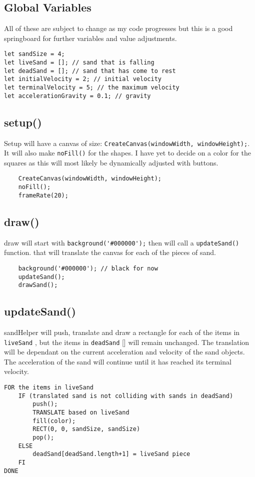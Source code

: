 \documentclass[12 pt]{report}
\begin{document}
\subsection{Global Variables} 
All of these are subject to change as my code progresses but this is a good springboard for further variables and value adjustments. 
\begin{verbatim}
let sandSize = 4; 
let liveSand = []; // sand that is falling
let deadSand = []; // sand that has come to rest
let initialVelocity = 2; // initial velocity
let terminalVelocity = 5; // the maximum velocity
let accelerationGravity = 0.1; // gravity
\end{verbatim}

\subsection{setup()} 
Setup will have a canvas of size: \verb|CreateCanvas(windowWidth, windowHeight);|. It will also make \verb|noFill()| for the shapes. I have yet to decide on a color for the squares as this will most likely be dynamically adjusted with buttons.
\begin{verbatim}
    CreateCanvas(windowWidth, windowHeight);
    noFill();
    frameRate(20);
\end{verbatim}


\subsection{draw()}
draw will start with \verb|background('#000000');| then will call a \verb|updateSand()| function. that will translate the canvas for each of the pieces of sand.
\begin{verbatim}
    background('#000000'); // black for now
    updateSand(); 
    drawSand();
\end{verbatim}

\subsection{updateSand()} 
sandHelper will push, translate and draw a rectangle for each of the items in \verb|liveSand| , but the items in \verb|deadSand| [] will remain unchanged. The translation will be dependant on the current acceleration and velocity of the sand objects. The acceleration of the sand will continue until it has reached its terminal velocity. 
\begin{verbatim}
FOR the items in liveSand
    IF (translated sand is not colliding with sands in deadSand)
        push();
        TRANSLATE based on liveSand
        fill(color);
        RECT(0, 0, sandSize, sandSize)
        pop();
    ELSE
        deadSand[deadSand.length+1] = liveSand piece
    FI
DONE
\end{verbatim}
\end{document}
